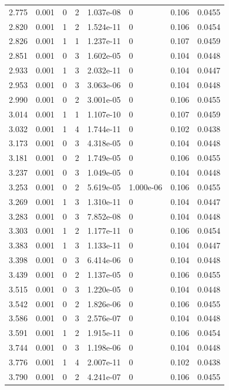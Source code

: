 \documentclass[preview]{standalone}
\begin{document}
{{{\begin{tabular}{L{1.2cm}C{1.2cm} C{0.3cm}C{0.5cm} C{1.4cm}C{1.4cm} C{1.4cm}C{1.4cm}}
  2.775  &  0.001  & 0     &  2 &  1.037e-08  & 0  & 0.106 &  0.0455   \\ 
  2.820  &  0.001  & 1     &  2 &  1.524e-11  & 0  & 0.106 &  0.0454   \\ 
  2.826  &  0.001  & 1     &  1 &  1.237e-11  & 0  & 0.107 &  0.0459   \\ 
  2.851  &  0.001  & 0     &  3 &  1.602e-05  & 0  & 0.104 &  0.0448   \\ 
  2.933  &  0.001  & 1     &  3 &  2.032e-11  & 0  & 0.104 &  0.0447   \\ 
  2.953  &  0.001  & 0     &  3 &  3.063e-06  & 0  & 0.104 &  0.0448   \\ 
  2.990  &  0.001  & 0     &  2 &  3.001e-05  & 0  & 0.106 &  0.0455   \\ 
  3.014  &  0.001  & 1     &  1 &  1.107e-10  & 0  & 0.107 &  0.0459   \\ 
  3.032  &  0.001  & 1     &  4 &  1.744e-11  & 0  & 0.102 &  0.0438   \\ 
  3.173  &  0.001  & 0     &  3 &  4.318e-05  & 0  & 0.104 &  0.0448   \\ 
  3.181  &  0.001  & 0     &  2 &  1.749e-05  & 0  & 0.106 &  0.0455   \\ 
  3.237  &  0.001  & 0     &  3 &  1.049e-05  & 0  & 0.104 &  0.0448   \\ 
  3.253  &  0.001  & 0     &  2 &  5.619e-05  & 1.000e-06  & 0.106 &  0.0455   \\ 
  3.269  &  0.001  & 1     &  3 &  1.310e-11  & 0  & 0.104 &  0.0447   \\ 
  3.283  &  0.001  & 0     &  3 &  7.852e-08  & 0  & 0.104 &  0.0448   \\ 
  3.303  &  0.001  & 1     &  2 &  1.177e-11  & 0  & 0.106 &  0.0454   \\ 
  3.383  &  0.001  & 1     &  3 &  1.133e-11  & 0  & 0.104 &  0.0447   \\ 
  3.398  &  0.001  & 0     &  3 &  6.414e-06  & 0  & 0.104 &  0.0448   \\ 
  3.439  &  0.001  & 0     &  2 &  1.137e-05  & 0  & 0.106 &  0.0455   \\ 
  3.515  &  0.001  & 0     &  3 &  1.220e-05  & 0  & 0.104 &  0.0448   \\ 
  3.542  &  0.001  & 0     &  2 &  1.826e-06  & 0  & 0.106 &  0.0455   \\ 
  3.586  &  0.001  & 0     &  3 &  2.576e-07  & 0  & 0.104 &  0.0448   \\ 
  3.591  &  0.001  & 1     &  2 &  1.915e-11  & 0  & 0.106 &  0.0454   \\ 
  3.744  &  0.001  & 0     &  3 &  1.198e-06  & 0  & 0.104 &  0.0448   \\ 
  3.776  &  0.001  & 1     &  4 &  2.007e-11  & 0  & 0.102 &  0.0438   \\ 
  3.790  &  0.001  & 0     &  2 &  4.241e-07  & 0  & 0.106 &  0.0455   \\ 
\hline 
\end{tabular} 

}}}
\end{document}
